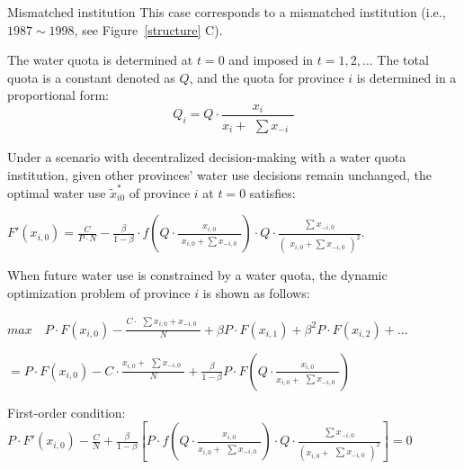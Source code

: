 \begin{case} Mismatched institution
    This case corresponds to a mismatched institution (i.e., $1987\sim1998$, see Figure~\ref{structure} C).

    The water quota is determined at $t=0$ and imposed in $t=1,2,\ldots$ The total quota is a constant denoted as $Q$, and the quota for province $i$ is determined in a proportional form:
    $$Q_i=Q \cdot \frac{x_i}{x_i + \begin{matrix} \sum x_{-i} \end{matrix}}$$

    Under a scenario with decentralized decision-making with a water quota institution, given other provinces’ water use decisions remain unchanged, the optimal water use $\widetilde x_{i0}^*$ of province $i$ at $t=0$ satisfies:

    $F'(x_{i,0})=\frac{C}{P \cdot N} - \frac{\beta}{1-\beta} \cdot f(Q \cdot \frac{x_{i,0}}{\begin{matrix} x_{i,0} + \sum x_{-i,0} \end{matrix}}) \cdot Q \cdot \frac{\begin{matrix} \sum x_{-i,0} \end{matrix}}{(\begin{matrix} x_{i,0} + \sum x_{-i,0} \end{matrix})^2}$.

    When future water use is constrained by a water quota, the dynamic optimization problem of province $i$ is shown as follows:

    $max  \quad P \cdot F(x_{i,0})-\frac{C \cdot \begin{matrix} \sum x_{i,0} + x_{-i,0} \end{matrix}}{N}+\beta P \cdot F(x_{i,1})+\beta^2 P \cdot F(x_{i,2})+...$

    $=P \cdot F(x_{i,0})-C \cdot \frac{x_{i,0} + \begin{matrix} \sum x_{-i,0} \end{matrix}}{N}+\frac{\beta}{1-\beta} P \cdot F(Q \cdot \frac{x_{i,0}}{x_{i,0} + \begin{matrix} \sum x_{-i,0} \end{matrix}})$

    First-order condition: $P \cdot F'(x_{i,0})-\frac{C}{N}+\frac{\beta}{1-\beta}[P \cdot f(Q \cdot \frac{x_{i,0}}{x_{i,0} + \begin{matrix} \sum x_{-i,0} \end{matrix}}) \cdot Q \cdot \frac{\begin{matrix} \sum x_{-i,0} \end{matrix}}{(x_{i,0}+\begin{matrix} \sum  x_{-i,0} \end{matrix})^2}]=0$


\end{case}
